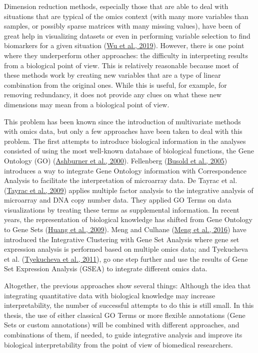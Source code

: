 \documentclass[a4paper, nobind]{templates/ociamthesis}
\begin{document}
Dimension reduction methods, especially those that are able to deal with situations that are typical of the omics context (with many more variables than samples, or possibly sparse matrices with many missing values), have been of great help in visualizing datasets or even in performing variable selection to find biomarkers for a given situation (\protect\hyperlink{ref-wu_selective_2019}{Wu et al., 2019}). However, there is one point where they underperform other approaches: the difficulty in interpreting results from a biological point of view. This is relatively reasonable because most of these methods work by creating new variables that are a type of linear combination from the original ones. While this is useful, for example, for removing redundancy, it does not provide any clues on what these new dimensions may mean from a biological point of view.

This problem has been known since the introduction of multivariate methods with omics data, but only a few approaches have been taken to deal with this problem. The first attempts to introduce biological information in the analyses consisted of using the most well-known database of biological functions, the Gene Ontology (GO) (\protect\hyperlink{ref-ashburner_gene_2000}{Ashburner et al., 2000}). Fellenberg (\protect\hyperlink{ref-busold_integration_2005}{Busold et al., 2005}) introduces a way to integrate Gene Ontology information with Correspondence Analysis to facilitate the interpretation of microarray data. De Tayrac et al. (\protect\hyperlink{ref-de_tayrac_simultaneous_2009}{Tayrac et al., 2009}) applies multiple factor analysis to the integrative analysis of microarray and DNA copy number data. They applied GO Terms on data visualizations by treating these terms as supplemental information. In recent years, the representation of biological knowledge has shifted from Gene Ontology to Gene Sets (\protect\hyperlink{ref-huang_bioinformatics_2009}{Huang et al., 2009}). Meng and Culhane (\protect\hyperlink{ref-meng_dimension_2016}{Meng et al., 2016}) have introduced the Integrative Clustering with Gene Set Analysis where gene set expression analysis is performed based on multiple omics data; and Tyekucheva et al. (\protect\hyperlink{ref-tyekucheva_integrating_2011}{Tyekucheva et al., 2011}), go one step further and use the results of Gene Set Expression Analysis (GSEA) to integrate different omics data.

Altogether, the previous approaches show several things: Although the idea that integrating quantitative data with biological knowledge may increase interpretability, the number of successful attempts to do this is still small. In this thesis, the use of either classical GO Terms or more flexible annotations (Gene Sets or custom annotations) will be combined with different approaches, and combinations of them, if needed, to guide integrative analysis and improve its biological interpretability from the point of view of biomedical researchers.
\end{document}
